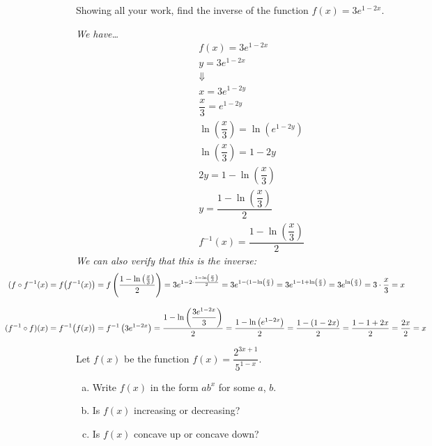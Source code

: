 \documentclass[12pt,letterpaper]{exam}
\begin{document}
\begin{questions}
\newpage
\question[10] Showing all your work, find the inverse of the function $f(x)= 3e^{1 - 2x}$. \pspace

{\itshape 
\sol We have\dots
	\[
	\begin{gathered}
	f(x)= 3e^{1 - 2x} \\[0.3cm]
	y= 3e^{1 - 2x} \\[0.3cm]
	\Downarrow \\[0.3cm]
	x= 3e^{1 - 2y} \\[0.3cm]
	\dfrac{x}{3}= e^{1 - 2y} \\[0.3cm]
	\ln\left( \dfrac{x}{3} \right)= \ln \left( e^{1 - 2y} \right) \\[0.3cm]
	\ln\left( \dfrac{x}{3} \right)= 1 - 2y \\[0.3cm]
	2y= 1 - \ln\left( \dfrac{x}{3} \right) \\[0.3cm]
	y= \dfrac{1 - \ln\left( \dfrac{x}{3} \right)}{2} \\[0.3cm]
	f^{-1}(x)= \dfrac{1 - \ln\left( \dfrac{x}{3} \right)}{2}
	\end{gathered}
	\] \pspace
We can also verify that this is the inverse:
	\[
	\begin{aligned}
	\hspace{-3.1cm} (f \circ f^{-1}(x)&= f \big( f^{-1}(x) \big)= f \left( \frac{1 - \ln\left( \frac{x}{3} \right)}{2} \right)= 3 e^{1 - 2 \cdot \frac{1 - \ln\left( \frac{x}{3} \right)}{2}}= 3e^{1 - (1 - \ln\left( \frac{x}{3} \right)}= 3e^{1 - 1 + \ln\left( \frac{x}{3} \right)}= 3e^{\ln\left( \frac{x}{3} \right)}= 3 \cdot \dfrac{x}{3}= x \\[0.3cm]
	\hspace{-3.1cm} (f^{-1} \circ f)(x)&= f^{-1} \big( f(x) \big)= f^{-1} \left( 3e^{1 - 2x} \right)= \dfrac{1 - \ln\left( \dfrac{3e^{1 - 2x}}{3} \right)}{2}= \dfrac{1 - \ln \left( e^{1 - 2x} \right)}{2}= \dfrac{1 - (1 - 2x)}{2}= \dfrac{1 - 1 + 2x}{2}= \dfrac{2x}{2}= x
	\end{aligned}
	\]
}



\newpage
\question[10] Let $f(x)$ be the function $f(x)= \dfrac{2^{3x + 1}}{5^{1 - x}}$.
	\begin{enumerate}[(a)]
	\item Write $f(x)$ in the form $ab^x$ for some $a$, $b$. 
	\item Is $f(x)$ increasing or decreasing?
	\item Is $f(x)$ concave up or concave down?
	\end{enumerate} \pspace


\end{questions}
\end{document}
